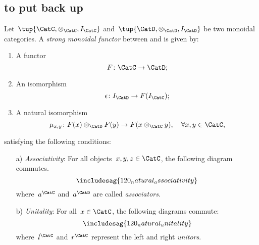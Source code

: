 \subsection{to put back up}


\begin{ctdefinition}
Let~$\tup{\CatC,\otimes_\CatC,I_\CatC}$ and~$\tup{\CatD,\otimes_\CatD,I_\CatD}$ be two monoidal categories. A \emph{strong monoidal functor} between \CatC and \CatD is given by:
\begin{enumerate}
    \item A functor
    \begin{equation}
        F\colon \CatC\to \CatD;
    \end{equation}
    \item An isomorphism
    \begin{equation}
        \epsilon\colon I_\CatD\to F(I_\CatC);
    \end{equation}
    \item A natural isomorphism
    \begin{equation}
        \mu_{x,y}\colon F(x)\otimes_\CatD F(y) \to F(x\otimes_\CatC y),\quad \forall x,y\in \CatC,
    \end{equation}
\end{enumerate}
satisfying the following conditions:
\begin{enumerate}
    \item[a)] \emph{Associativity}: For all objects~$x,y,z\in \CatC$, the following diagram commutes.
    \begin{equation}
        \includesag{120_natural_associativity}
    \end{equation}
    where~$a^\CatC$ and~$a^\CatD$ are called \emph{associators}.
    \item[b)] \emph{Unitality}: For all~$x\in \CatC$, the following diagrams commute:
    \begin{equation}
        \includesag{120_natural_unitality}
    \end{equation}
    where~$l^\CatC$ and~$r^\CatC$ represent the left and right \emph{unitors}.
\end{enumerate}
\end{ctdefinition}


